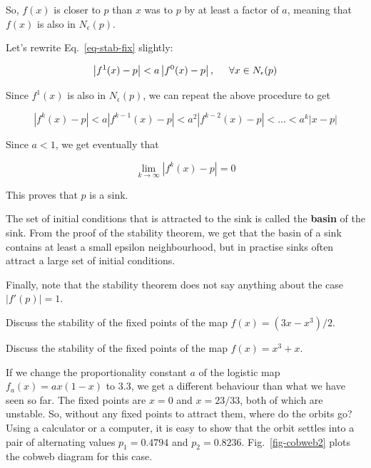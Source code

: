 So, $f(x)$ is closer to $p$ than $x$ was to $p$ by at least a factor of $a$, meaning that $f(x)$ is also in $N_\epsilon(p)$.

Let's rewrite Eq.~\ref{eq-stab-fix} slightly:

\begin{equation}
\left|f^1(x)-p\right| < a \left|f^0(x)-p\right|,  \hspace{.5cm} \forall x \in N_\epsilon(p)
\end{equation} 

Since $f^1(x)$ is also in $N_\epsilon(p)$, we can repeat the above procedure to get

\begin{equation}
\left|f^k(x)-p\right| < a\left|f^{k-1}(x)-p\right| < a^2\left|f^{k-2}(x)-p\right|< ... < a^k |x-p| 
\end{equation}  

Since $a<1$, we get eventually that

\begin{equation}
\lim_{k \to \infty} \left|f^k(x)-p\right| = 0
\end{equation} 

This proves that $p$ is a sink.

The set of initial conditions that is attracted to the sink is called the \textbf{basin} of the sink. From the proof of the stability theorem, we get that the basin of a sink contains at least a small epsilon neighbourhood, but in practise sinks often attract a large set of initial conditions.

Finally, note that the stability theorem does not say anything about the case $|f'(p)|=1$.

\begin{exer}
Discuss the stability of the fixed points of the map $f(x) = (3x-x^3)/2$.
\end{exer}


\begin{exer}
Discuss the stability of the fixed points of the map $f(x) = x^3 + x$.
\end{exer}


\pagebreak


If we change the proportionality constant $a$ of the logistic map $f_a(x)=ax(1-x)$ to 3.3, we get a different behaviour than what we have seen so far. The fixed points are $x=0$ and $x=23/33$, both of which are unstable. So, without any fixed points to attract them, where do the orbits go? Using a calculator or a computer, it is easy to show that the orbit settles into a pair of alternating values $p_1=0.4794$ and $p_2=0.8236$. Fig.~\ref{fig-cobweb2} plots the cobweb diagram for this case.

